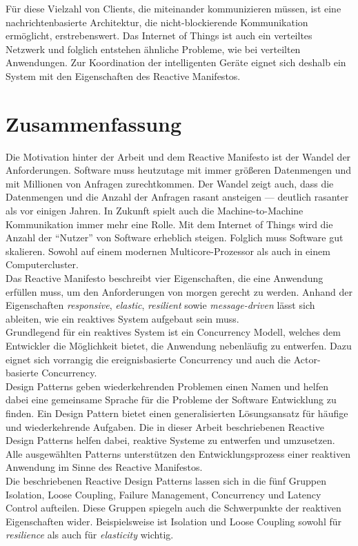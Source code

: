Für diese Vielzahl von Clients, die miteinander kommunizieren müssen, ist eine nachrichtenbasierte Architektur, die nicht-blockierende Kommunikation ermöglicht, erstrebenswert. Das Internet of Things ist auch ein verteiltes Netzwerk und folglich entstehen ähnliche Probleme, wie bei verteilten Anwendungen. Zur Koordination der intelligenten Geräte eignet sich deshalb ein System mit den Eigenschaften des Reactive Manifestos. 

\pagebreak

\section{Zusammenfassung}
Die Motivation hinter der Arbeit und dem Reactive Manifesto ist der Wandel der Anforderungen. Software muss heutzutage mit immer größeren Datenmengen und mit Millionen von Anfragen zurechtkommen. Der Wandel zeigt auch, dass die Datenmengen und die Anzahl der Anfragen rasant ansteigen --- deutlich rasanter als vor einigen Jahren. In Zukunft spielt auch die Machine-to-Machine Kommunikation immer mehr eine Rolle. Mit dem Internet of Things wird die Anzahl der \enquote{Nutzer} von Software erheblich steigen. Folglich muss Software gut skalieren. Sowohl auf einem modernen Multicore-Prozessor als auch in einem Computercluster.\\
Das Reactive Manifesto beschreibt vier Eigenschaften, die eine Anwendung erfüllen muss, um den Anforderungen von morgen gerecht zu werden. Anhand der Eigenschaften \textit{responsive}, \textit{elastic}, \textit{resilient} sowie \textit{message-driven} lässt sich ableiten, wie ein reaktives System aufgebaut sein muss.\\
Grundlegend für ein reaktives System ist ein Concurrency Modell, welches dem Entwickler die Möglichkeit bietet, die Anwendung nebenläufig zu entwerfen. Dazu eignet sich vorrangig die ereignisbasierte Concurrency und auch die Actor-basierte Concurrency.\\
Design Patterns geben wiederkehrenden Problemen einen Namen und helfen dabei eine gemeinsame Sprache für die Probleme der Software Entwicklung zu finden. Ein Design Pattern bietet einen generalisierten Lösungsansatz für häufige und wiederkehrende Aufgaben. Die in dieser Arbeit beschriebenen Reactive Design Patterns helfen dabei, reaktive Systeme zu entwerfen und umzusetzen. Alle ausgewählten Patterns unterstützen den Entwicklungsprozess einer reaktiven Anwendung im Sinne des Reactive Manifestos.\\
Die beschriebenen Reactive Design Patterns lassen sich in die fünf Gruppen Isolation, Loose Coupling, Failure Management, Concurrency und Latency Control aufteilen. Diese Gruppen spiegeln auch die Schwerpunkte der reaktiven Eigenschaften wider. Beispielsweise ist Isolation und Loose Coupling sowohl für \textit{resilience} als auch für \textit{elasticity} wichtig.\\

